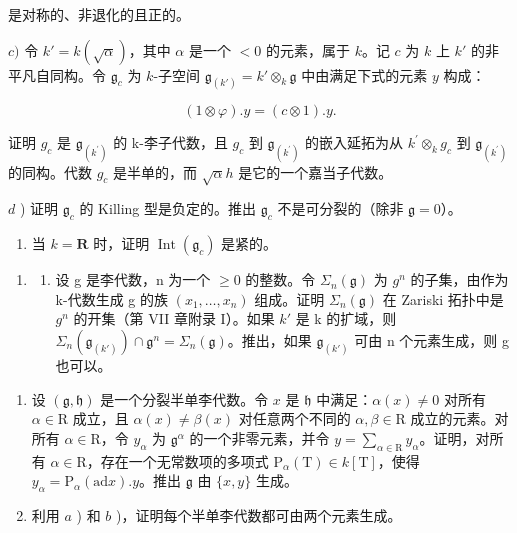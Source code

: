 是对称的、非退化的且正的。

\(c)\) 令 \(k' = k(\sqrt{\alpha})\)，其中 \(\alpha\) 是一个 \(< 0\) 的元素，属于 \(k\)。记 \(c\) 为 \(k\) 上 \(k'\) 的非平凡自同构。令 \(\mathfrak{g}_c\) 为 \(k\)-子空间 \(\mathfrak{g}_{(k')} = k' \otimes_k \mathfrak{g}\) 中由满足下式的元素 \(y\) 构成：

\[
(1 \otimes \varphi). y = (c \otimes 1). y.
\]

证明 \(g_{c}\) 是 \(\mathfrak{g}_{(k^{\prime})}\) 的 k-李子代数，且 \(g_{c}\) 到 \(\mathfrak{g}_{(k^{\prime})}\) 的嵌入延拓为从 \(k^{\prime}\otimes_{k}g_{c}\) 到 \(\mathfrak{g}_{(k^{\prime})}\) 的同构。代数 \(g_{c}\) 是半单的，而 \(\sqrt{\alpha}h\) 是它的一个嘉当子代数。

\(d\) ) 证明 \(\mathfrak{g}_c\) 的 Killing 型是负定的。推出 \(\mathfrak{g}_c\) 不是可分裂的（除非 \(\mathfrak{g} = 0\)）。

\begin{enumerate}
\def\labelenumi{\alph{enumi})}
\setcounter{enumi}{4}
\tightlist
\item
  当 \(k = \mathbf{R}\) 时，证明 \(\operatorname{Int}(\mathfrak{g}_c)\) 是紧的。
\end{enumerate}

\begin{enumerate}
\def\labelenumi{\arabic{enumi})}
\setcounter{enumi}{7}
\tightlist
\item
  \begin{enumerate}
  \def\labelenumii{\alph{enumii})}
  \tightlist
  \item
    设 g 是李代数，n 为一个 \(\geq 0\) 的整数。令 \(\Sigma_{n}(\mathfrak{g})\) 为 \(g^{n}\) 的子集，由作为 k-代数生成 g 的族 \((x_{1},\ldots,x_{n})\) 组成。证明 \(\Sigma_{n}(\mathfrak{g})\) 在 Zariski 拓扑中是 \(g^{n}\) 的开集（第 VII 章附录 I）。如果 \(k'\) 是 k 的扩域，则 \(\Sigma_{n}(\mathfrak{g}_{(k')})\cap\mathfrak{g}^{n}=\Sigma_{n}(\mathfrak{g})\)。推出，如果 \(\mathfrak{g}_{(k')}\) 可由 n 个元素生成，则 g 也可以。
  \end{enumerate}
\end{enumerate}

\begin{enumerate}
\def\labelenumi{\alph{enumi})}
\setcounter{enumi}{1}
\item
  设 \((\mathfrak{g},\mathfrak{h})\) 是一个分裂半单李代数。令 \(x\) 是 \(\mathfrak{h}\) 中满足：\(\alpha (x)\neq 0\) 对所有 \(\alpha \in \mathrm{R}\) 成立，且 \(\alpha (x)\neq \beta (x)\) 对任意两个不同的 \(\alpha ,\beta \in \mathrm{R}\) 成立的元素。对所有 \(\alpha \in \mathrm{R}\)，令 \(y_{\alpha}\) 为 \(\mathfrak{g}^{\alpha}\) 的一个非零元素，并令 \(y = \sum_{\alpha \in \mathrm{R}}y_{\alpha}\)。证明，对所有 \(\alpha \in \mathrm{R}\)，存在一个无常数项的多项式 \(\mathrm{P}_{\alpha}(\mathrm{T})\in k[\mathrm{T}]\)，使得 \(y_{\alpha} = \mathrm{P}_{\alpha}(\mathrm{ad}x).y\)。推出 \(\mathfrak{g}\) 由 \(\{x,y\}\) 生成。
\item
  利用 \(a\) ) 和 \(b\) )，证明每个半单李代数都可由两个元素生成。
\end{enumerate}

